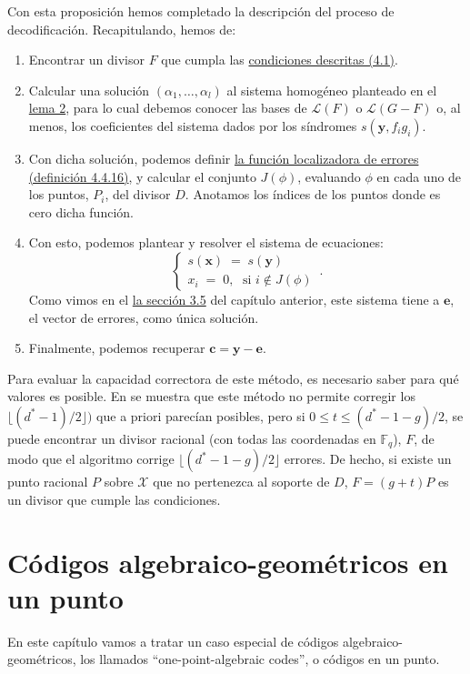 \documentclass[11pt,spanish]{book}
\begin{document}
Con esta proposición hemos completado la descripción del proceso de decodificación. Recapitulando, hemos de:
\begin{enumerate}
    \item Encontrar un divisor $F$ que cumpla las \hyperlink{condicionesF}{condiciones descritas (4.1)}.
    \item Calcular una solución $(\alpha_1,\ldots,\alpha_l)$ al sistema homogéneo planteado en el \hyperlink{lemaSistemaSindromeAG}{lema 2}, para lo cual debemos conocer las bases de $\mathcal{L}(F)$ o $\mathcal{L}(G-F)$ o, al menos, los coeficientes del sistema dados por los síndromes $s(\mathbf{y},f_ig_i)$.
    \item Con dicha solución, podemos definir \hyperlink{funcionlocalizadoradeerrores}{la función localizadora de errores (definición 4.4.16)}, y calcular el conjunto $J(\phi)$, evaluando $\phi$ en cada uno de los puntos, $P_i$, del divisor $D$. Anotamos los índices de los puntos donde es cero dicha función.
    \item Con esto, podemos plantear y resolver el sistema de ecuaciones:
    \begin{equation}
    \begin{cases}
    s(\mathbf{x})\;=\;s(\mathbf{y})\\
    x_{i}\;=\;0,\; \text{ si } i\notin J(\phi)
    \end{cases}\,.
\end{equation}
    Como vimos en el \hyperlink{sistemalinealcodigos}{la sección 3.5} del capítulo anterior, este sistema tiene a $\mathbf{e}$, el vector de errores, como única solución.
    \item Finalmente, podemos recuperar $\mathbf{c}=\mathbf{y}-\mathbf{e}$.
\end{enumerate}

Para evaluar la capacidad correctora de este método, es necesario saber para qué valores es posible. En \cite{Munuera} se muestra que este método no permite corregir los $\lfloor (d^*-1)/2\rfloor)$ que a priori parecían posibles, pero si $0 \leq t \leq (d^*-1-g)/2$, se puede encontrar un divisor racional (con todas las coordenadas en $\mathbb{F}_q$), $F$, de modo que el algoritmo corrige $\lfloor (d^*-1-g)/2 \rfloor$ errores. De hecho, si existe un punto racional $P$ sobre $\mathbf{\mathcal{X}}$ que no pertenezca al soporte de $D$, $F=(g+t)P$ es un divisor que cumple las condiciones. \\
\chapter{Códigos algebraico-geométricos en un punto}
En este capítulo vamos a tratar un caso especial de códigos algebraico-geométricos, los llamados ``one-point-algebraic codes'', o códigos en un punto.\\
\end{document}
